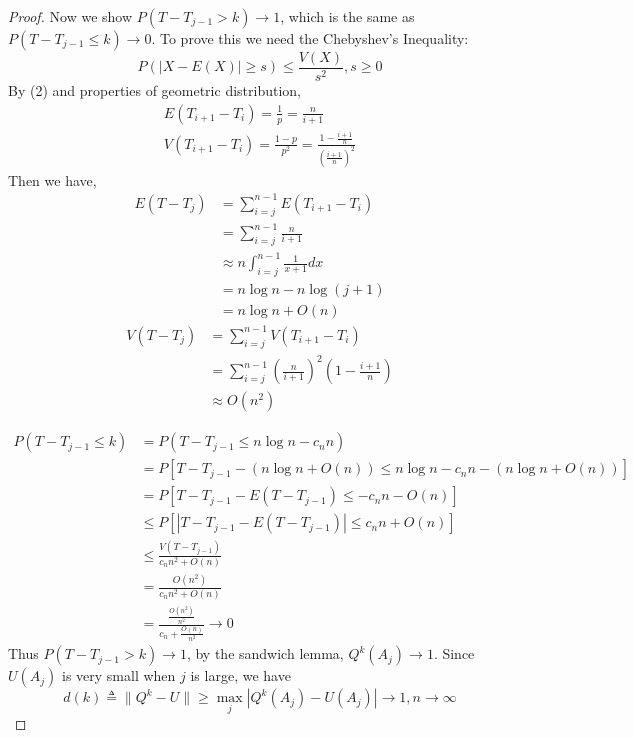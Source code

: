\documentclass[12pt]{article}
\theoremstyle{plain}
\theoremstyle{definition}
\theoremstyle{remark}
\begin{document}
\begin{proof}
Now we show $P(T-T_{j-1}>k)\rightarrow 1$, which is the same as $P(T-T_{j-1}\leq k)\rightarrow 0$. To prove this we need the Chebyshev's Inequality:
$$P(|X-E(X)|\geq s)\leq \frac{V(X)}{s^2},s\geq 0$$
By (2) and properties of geometric distribution,
\begin{gather*}
    E(T_{i+1}-T_i)=\frac{1}{p}=\frac{n}{i+1}\\
    V(T_{i+1}-T_i)=\frac{1-p}{p^2}=\frac{1-\frac{i+1}{n}}{(\frac{i+1}{n})^2}
\end{gather*}
Then we have,
\begin{equation*}
\begin{split}
    E(T-T_{j})&=\sum_{i=j}^{n-1}E(T_{i+1}-T_i)\\
    &=\sum_{i=j}^{n-1}\frac{n}{i+1}\\
    &\approx n\int_{i=j}^{n-1}\frac{1}{x+1}dx\\
    &=n\log n-n\log (j+1)\\
    &=n\log n+O(n)
\end{split}
\end{equation*}
\begin{equation*}
    \begin{split}
    V(T-T_{j})&=\sum_{i=j}^{n-1}V(T_{i+1}-T_i)\\
    &=\sum_{i=j}^{n-1}(\frac{n}{i+1})^2(1-\frac{i+1}{n})\\
    &\approx O(n^2)
    \end{split}
\end{equation*}

\begin{equation*}
    \begin{split}
    P(T-T_{j-1}\leq k)
    &=P(T-T_{j-1}\leq n\log n -c_nn)\\
    &=P[T-T_{j-1}-(n\log n+O(n))\leq n\log n -c_nn-(n\log n+O(n))]\\
    &=P[T-T_{j-1}-E(T-T_{j-1})\leq -c_nn-O(n)]\\
    &\leq P[|T-T_{j-1}-E(T-T_{j-1})|\leq c_nn+O(n)]\\
    &\leq \frac{V(T-T_{j-1})}{c_nn^2+O(n)}\\
    &=\frac{O(n^2)}{c_nn^2+O(n)}\\
    &=\frac{\frac{O(n^2)}{n^2}}{c_n+\frac{O(n)}{n^2}}\longrightarrow 0
    \end{split}
\end{equation*}
Thus $P(T-T_{j-1}>k)\rightarrow 1$, by the sandwich lemma, $Q^k(A_j)\rightarrow 1$. Since $U(A_j)$ is very small when $j$ is large, we have $$d(k)\triangleq \|Q^k-U\| \geq \max_{j}|Q^k(A_j)-U(A_j)|\rightarrow 1, n\rightarrow \infty$$
\end{proof}
\end{document}

